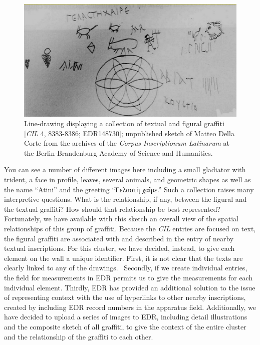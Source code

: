 \documentclass[amsthm,ebook]{saparticle}
\begin{document}
\begin{figure}[!bp]
\centering
 \includegraphics[width=\columnwidth]{EAGLE2016BenefielSypniewski-img004.jpg}
\caption{Line-drawing displaying a collection of textual and figural graffiti [\emph{CIL} 4, 8383-8386; EDR148730]; unpublished
sketch of Matteo Della Corte from the archives of the \emph{Corpus Inscriptionum Latinarum} at the Berlin-Brandenburg Academy
of Science and Humanities.}
\label{fig:4}
\end{figure}




You can see a number of different images here including a small gladiator with trident, a face in profile, leaves,
several animals, and geometric shapes as well as the name ``Atini'' and the greeting ``\textgreek{Γελαστὴ χαῖρε}.'' Such a collection raises many interpretive questions. What is the relationship, if any, between the figural and the
textual graffiti? How should that relationship be best represented? Fortunately, we have available with this sketch an
overall view of the spatial relationships of this group of graffiti. Because the \emph{CIL} entries are focused on text, the
figural graffiti are associated with and described in the entry of nearby textual inscriptions. For this cluster, we
have decided, instead, to give each element on the wall a unique identifier. First, it is not clear that the texts are
clearly linked to any of the drawings. \ Secondly, if we create individual entries, the field for measurements in EDR
permits us to give the measurements for each individual element. Thirdly, EDR has provided an additional solution to
the issue of representing context with the use of hyperlinks to other nearby inscriptions, created by including EDR
record numbers in the apparatus field. Additionally, we have decided to upload a series of images to EDR, including
detail illustrations and the composite sketch of all graffiti, to give the context of the entire cluster and the
relationship of the graffiti to each other.
\end{document}
